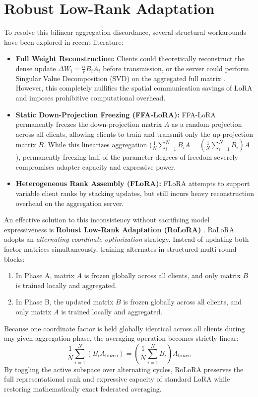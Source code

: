 \section{Robust Low-Rank Adaptation}
\label{sec:intro-rolora}
To resolve this bilinear aggregation discordance, several structural workarounds have been explored in recent literature:
\begin{itemize}
    \item \textbf{Full Weight Reconstruction:} Clients could theoretically reconstruct the dense update $\Delta W_i = \frac{\alpha}{r} B_i A_i$ before transmission, or the server could perform Singular Value Decomposition (SVD) on the aggregated full matrix \cite{yang2025federated}. However, this completely nullifies the spatial communication savings of LoRA and imposes prohibitive computational overhead.
    \item \textbf{Static Down-Projection Freezing (FFA-LoRA):} FFA-LoRA \cite{sun2024improving} permanently freezes the down-projection matrix $A$ as a random projection across all clients, allowing clients to train and transmit only the up-projection matrix $B$. While this linearizes aggregation ($\frac{1}{N}\sum_{i=1}^N B_i A = \left(\frac{1}{N}\sum_{i=1}^N B_i\right) A$), permanently freezing half of the parameter degrees of freedom severely compromises adapter capacity and expressive power.
    \item \textbf{Heterogeneous Rank Assembly (FLoRA):} FLoRA \cite{wang2024flora} attempts to support variable client ranks by stacking updates, but still incurs heavy reconstruction overhead on the aggregation server.
\end{itemize}

An effective solution to this inconsistency without sacrificing model expressiveness is \textbf{Robust Low-Rank Adaptation (RoLoRA)} \cite{chen2025robust}. RoLoRA adopts an \emph{alternating coordinate optimization} strategy. Instead of updating both factor matrices simultaneously, training alternates in structured multi-round blocks:
\begin{enumerate}
    \item In Phase A, matrix $A$ is frozen globally across all clients, and only matrix $B$ is trained locally and aggregated.
    \item In Phase B, the updated matrix $B$ is frozen globally across all clients, and only matrix $A$ is trained locally and aggregated.
\end{enumerate}

Because one coordinate factor is held globally identical across all clients during any given aggregation phase, the averaging operation becomes strictly linear:
\begin{equation}
    \frac{1}{N} \sum_{i=1}^{N} (B_i A_{\text{frozen}}) = \left( \frac{1}{N} \sum_{i=1}^{N} B_i \right) A_{\text{frozen}}
    \label{eq:intro_rolora_linearity}
\end{equation}
By toggling the active subspace over alternating cycles, RoLoRA preserves the full representational rank and expressive capacity of standard LoRA while restoring mathematically exact federated averaging.

